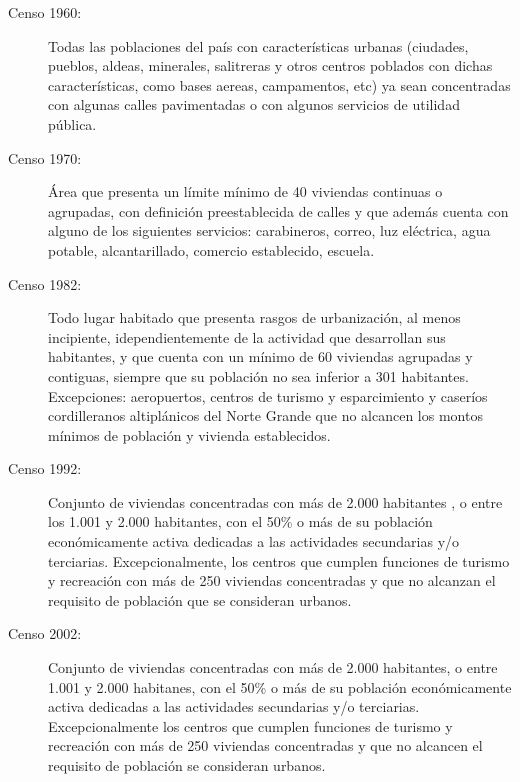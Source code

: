 \begin{description}
  \item[Censo 1960:] Todas las poblaciones del país con características urbanas (ciudades, pueblos,
  aldeas, minerales, salitreras y otros centros poblados con dichas características, como bases
  aereas, campamentos, etc) ya sean concentradas con algunas calles pavimentadas o con algunos
  servicios de utilidad pública.
  \item[Censo 1970:] Área que presenta un límite mínimo de 40 viviendas continuas o agrupadas, con
  definición preestablecida de calles y que además cuenta con alguno de los siguientes servicios:
  carabineros, correo, luz eléctrica, agua potable, alcantarillado, comercio establecido, escuela.
  \item[Censo 1982:] Todo lugar habitado que presenta rasgos de urbanización, al menos incipiente,
  idependientemente de la actividad que desarrollan sus habitantes, y que cuenta con un mínimo de 60
  viviendas agrupadas y contiguas, siempre que su población no sea inferior a 301 habitantes.
  Excepciones: aeropuertos, centros de turismo y esparcimiento y caseríos cordilleranos altiplánicos
  del Norte Grande que no alcancen los montos mínimos de población y vivienda establecidos.
  \item[Censo 1992:] Conjunto de viviendas concentradas con más de 2.000 habitantes , o entre los
  1.001 y 2.000 habitantes, con el 50\% o más de su población económicamente activa dedicadas a las
  actividades secundarias y/o terciarias. Excepcionalmente, los centros que cumplen funciones de
  turismo y recreación con más de 250 viviendas concentradas y que no alcanzan el requisito de
  población que se consideran urbanos.
  \item[Censo 2002:] Conjunto de viviendas concentradas con más de 2.000 habitantes, o entre 1.001 y
  2.000 habitanes, con el 50\% o más de su población económicamente activa dedicadas a las
  actividades secundarias y/o terciarias. Excepcionalmente los centros que cumplen funciones de
  turismo y recreación con más de 250 viviendas concentradas y que no alcancen el requisito de
  población se consideran urbanos.
\end{description}
